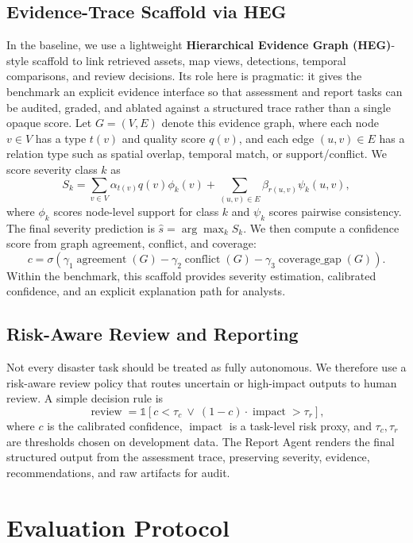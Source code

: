 \documentclass{article}
\begin{document}
\subsection{Evidence-Trace Scaffold via HEG}

In the baseline, we use a lightweight \textbf{Hierarchical Evidence Graph (HEG)}-style scaffold to link retrieved assets, map views, detections, temporal comparisons, and review decisions. Its role here is pragmatic: it gives the benchmark an explicit evidence interface so that assessment and report tasks can be audited, graded, and ablated against a structured trace rather than a single opaque score. Let $G=(V,E)$ denote this evidence graph, where each node $v \in V$ has a type $t(v)$ and quality score $q(v)$, and each edge $(u,v)\in E$ has a relation type such as spatial overlap, temporal match, or support/conflict. We score severity class $k$ as
\[
S_k = \sum_{v \in V} \alpha_{t(v)} q(v)\phi_k(v) + \sum_{(u,v)\in E} \beta_{r(u,v)} \psi_k(u,v),
\]
where $\phi_k$ scores node-level support for class $k$ and $\psi_k$ scores pairwise consistency. The final severity prediction is $\hat{s}=\arg\max_k S_k$. We then compute a confidence score from graph agreement, conflict, and coverage:
\[
c = \sigma\!\left(\gamma_1 \operatorname{agreement}(G) - \gamma_2 \operatorname{conflict}(G) - \gamma_3 \operatorname{coverage\_gap}(G)\right).
\]
Within the benchmark, this scaffold provides severity estimation, calibrated confidence, and an explicit explanation path for analysts.

\subsection{Risk-Aware Review and Reporting}

Not every disaster task should be treated as fully autonomous. We therefore use a risk-aware review policy that routes uncertain or high-impact outputs to human review. A simple decision rule is
\[
\operatorname{review} = \mathbb{1}[c < \tau_c \ \lor\ (1-c)\cdot \operatorname{impact} > \tau_r],
\]
where $c$ is the calibrated confidence, $\operatorname{impact}$ is a task-level risk proxy, and $\tau_c,\tau_r$ are thresholds chosen on development data. The Report Agent renders the final structured output from the assessment trace, preserving severity, evidence, recommendations, and raw artifacts for audit.

\section{Evaluation Protocol}
\end{document}
